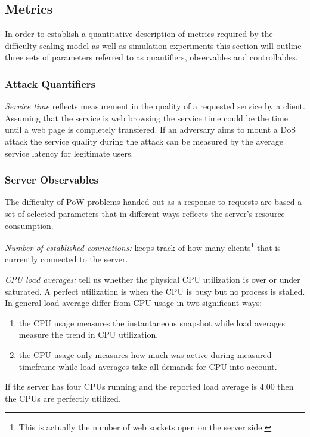 \subsection{Metrics}
In order to establish a quantitative description of metrics required by the difficulty scaling model as well as simulation experiments
 this section will outline three sets of parameters referred to as quantifiers, observables and controllables. 

\subsubsection{Attack Quantifiers}

\emph{Service time} reflects measurement in the quality of a requested service by a client. Assuming that the service is web browsing the service time could be the time until a web page is completely transfered. If an adversary aims to mount a DoS attack the service quality during the attack can be measured by the average service latency for legitimate users. 

\subsubsection{Server Observables}
The difficulty of PoW problems handed out as a response to requests are based a set of selected parameters that in different ways reflects the server's resource consumption.

\emph{Number of established connections:} keeps track of how many clients\footnote{This is actually the number of web sockets open on the server side.} that is currently connected to the server.

\emph{CPU load averages:} tell us whether the physical CPU utilization is over or under saturated. A perfect utilization is when the CPU is busy but no process is stalled. In general load average differ from CPU usage in two significant ways:
\begin{enumerate}
\item the CPU usage measures the instantaneous snapshot while load averages measure the trend in CPU utilization.
\item the CPU usage only measures how much was active during measured timeframe while load averages take all demands for CPU into account.
\end{enumerate}
If the server has four CPUs running and the reported load average is 4.00 then the CPUs are perfectly utilized\cite{cpu}.

